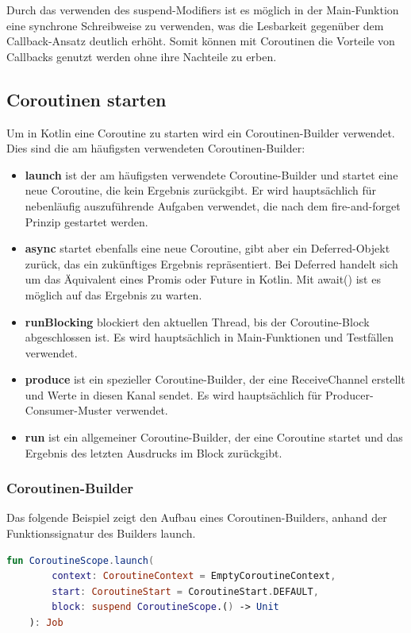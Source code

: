 \documentclass[fontsize=12pt,paper=a4,twoside=semi,parskip=half-,headsepline,headinclude]{scrreprt}
\begin{document}
Durch das verwenden des suspend-Modifiers ist es möglich in der Main-Funktion eine synchrone Schreibweise zu verwenden, was die Lesbarkeit gegenüber dem Callback-Ansatz deutlich erhöht. Somit können mit Coroutinen die Vorteile von Callbacks genutzt werden ohne ihre Nachteile zu erben.

\subsection{Coroutinen starten}

Um in Kotlin eine Coroutine zu starten wird ein Coroutinen-Builder verwendet. Dies sind die am häufigsten verwendeten Coroutinen-Builder:

\begin{itemize}
	\item \textbf{launch} ist der am häufigsten verwendete Coroutine-Builder und startet eine neue Coroutine, die kein Ergebnis zurückgibt. Er wird hauptsächlich für nebenläufig auszuführende Aufgaben verwendet, die nach dem fire-and-forget Prinzip gestartet werden.
	\item \textbf{async} startet ebenfalls eine neue Coroutine, gibt aber ein Deferred-Objekt zurück, das ein zukünftiges Ergebnis repräsentiert. Bei Deferred handelt sich um das Äquivalent eines Promis oder Future in Kotlin. Mit await() ist es möglich auf das Ergebnis zu warten.
	\item \textbf{runBlocking} blockiert den aktuellen Thread, bis der Coroutine-Block abgeschlossen ist. Es wird hauptsächlich in Main-Funktionen und Testfällen verwendet.
	\item \textbf{produce} ist ein spezieller Coroutine-Builder, der eine ReceiveChannel erstellt und Werte in diesen Kanal sendet. Es wird hauptsächlich für Producer-Consumer-Muster verwendet.
	\item \textbf{run} ist ein allgemeiner Coroutine-Builder, der eine Coroutine startet und das Ergebnis des letzten Ausdrucks im Block zurückgibt.
\end{itemize}

\subsubsection{Coroutinen-Builder}

Das folgende Beispiel zeigt den Aufbau eines Coroutinen-Builders, anhand der Funktionssignatur des Builders launch.

\begin{lstlisting}[language=Kotlin]
	fun CoroutineScope.launch(
		context: CoroutineContext = EmptyCoroutineContext,
		start: CoroutineStart = CoroutineStart.DEFAULT,
		block: suspend CoroutineScope.() -> Unit
	): Job
\end{lstlisting}
\end{document}
